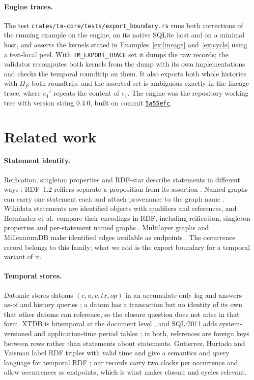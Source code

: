 \documentclass[11pt]{article}
\theoremstyle{plain}
\theoremstyle{definition}
\theoremstyle{remark}
\begin{document}
\paragraph{Engine traces.}
The test \texttt{crates/tm-core/tests/export\_boundary.rs} runs both corrections of
the running example on the engine, on its native SQLite host and on a minimal host,
and asserts the kernels stated in Examples~\ref{ex:lineage} and~\ref{ex:cycle}
using a test-local peel. With \texttt{TM\_EXPORT\_TRACE} set it dumps the raw
records; the validator recomputes both kernels from the dump with its own
implementations and checks the temporal roundtrip on them. It also exports both
whole histories with $\Omega_f$: both roundtrip, and the asserted set is ambiguous
exactly in the lineage trace, where $e_1'$ repeats the content of $e_1$. The engine was the
repository working tree with version string 0.4.0, built on commit
\href{https://github.com/Volland/tiramemsu/tree/5a55efc}{\texttt{5a55efc}}.

\section{Related work}
\paragraph{Statement identity.}
Reification, singleton properties and RDF-star describe statements in different ways
\cite{hernandez2015reifying,nguyen2014singleton,hartig2017rdfstar}; RDF~1.2
reifiers separate a proposition from its assertion \cite{w3c2026rdf12concepts}.
Named graphs can carry one statement each and attach provenance to the graph name
\cite{carroll2005named}. Wikidata statements are identified objects with qualifiers
and references, and Hernández et al.\ compare their encodings in RDF, including
reification, singleton properties and per-statement named graphs
\cite{vrandecic2014wikidata,hernandez2015reifying}. Multilayer graphs and
MillenniumDB make identified edges available as endpoints
\cite{angles2022multilayer,vrgoc2023millenniumdb}. The occurrence record belongs to
this family; what we add is the export boundary for a temporal variant of it.

\paragraph{Temporal stores.}
Datomic stores datoms $(e,a,v,tx,op)$ in an accumulate-only log and answers as-of and
history queries \cite{datomic}; a datom has a transaction but no identity of its own
that other datoms can reference, so the closure question does not arise in that
form. XTDB is bitemporal at the document level \cite{xtdb}, and SQL:2011 adds
system-versioned and application-time period tables \cite{kulkarni2012sql2011}; in
both, references are foreign keys between rows rather than statements about
statements. Gutierrez, Hurtado and Vaisman label RDF triples with valid time and give
a semantics and query language for temporal RDF \cite{gutierrez2007time}; our
records carry two clocks per occurrence and allow occurrences as endpoints, which is
what makes closure and cycles relevant.
\end{document}
